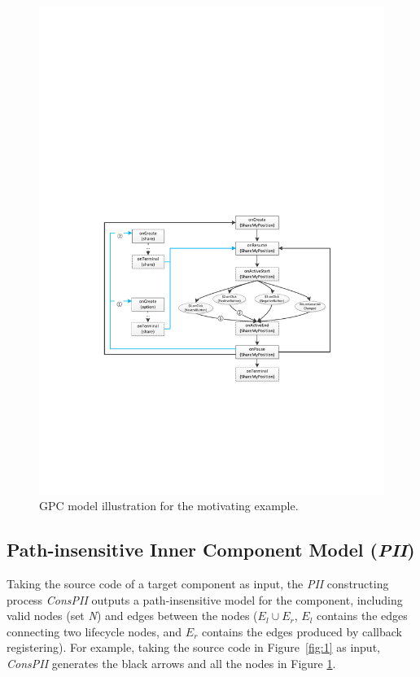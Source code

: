   \begin{figure}[t]%
  \centering
  \includegraphics[width=0.6\linewidth]{pic/motivationGPM.pdf}  
  \caption{GPC model illustration for the motivating example.}  
  \label{fig:motivationGPC} 
  \end{figure}

\subsection{Path-insensitive Inner Component Model (\textit{PII})}
Taking the source code of a target component as input, the \textit{PII} constructing process \textit{ConsPII} 
outputs a path-insensitive model for the component, including valid nodes (set \textit{N}) and edges between the nodes ($E_{l} \cup E_{r}$, $E_l$ contains the edges connecting two lifecycle nodes, and $E_r$ contains the edges produced by callback registering).
For example, taking the source code in Figure~\ref{fig:1} as input, \textit{ConsPII} generates the black arrows and all the nodes in Figure \ref{fig:motivationGPC}. 

